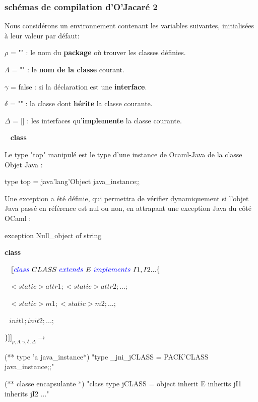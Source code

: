 \documentclass[a4paper, 11pt]{article}
\begin{document}
\subsubsection{schémas de compilation d'O'Jacaré 2}

\noindent
Nous considérons un environnement contenant les  variables suivantes, initialisées à leur valeur par défaut: 

$\rho$ = "" : le nom du \textbf{package} où trouver les classes définies.

$\Lambda$ = "" : le \textbf{nom de la classe} courant.

$\gamma$ = false : si la déclaration est une \textbf{interface}.

$\delta$ = "" : la classe dont \textbf{hérite} la classe courante.

$\Delta$ = [] : les interfaces qu'\textbf{implemente} la classe courante.
\ %


\ 
\newline
\textbf{class}

Le type "top" manipulé est le type d'une instance de Ocaml-Java de la classe Objet Java :
\begin{OCamlEx}
type top = java'lang'Object java_instance;;
\end{OCamlEx}

Une exception a été définie, qui permettra de vérifier dynamiquement si l'objet Java passé en référence est nul ou non, en attrapant une exception Java du côté OCaml : 

\begin{OCamlEx}
exception Null_object of string
\end{OCamlEx}


\newpage
\noindent
\textbf{class}

\ 
\newline
\noindent
$[\![ {\color{blue}class}\ CLASS\ 
 {\color{blue}extends}\  E \ 
 {\color{blue}implements}\  I1,I2... \{$

 $ \ \ \ <static> attr1; <static> attr2; ...;$

  $\ \ \ <static> m1; <static> m2; ...;$

  $\ \ \ init1; init2; ...;$

\noindent
 $\} ]\!]_{\rho,\Lambda,\gamma,\delta,\Delta}\longrightarrow$

\begin{OCaml}
(** type 'a java_instance*)
"type _jni_jCLASS = PACK'CLASS java_instance;;"

(** classe encapsulante *)
"class type jCLASS =
   object inherit E
   inherits jI1
   inherits jI2 ..."
\end{OCaml}
\end{document}
